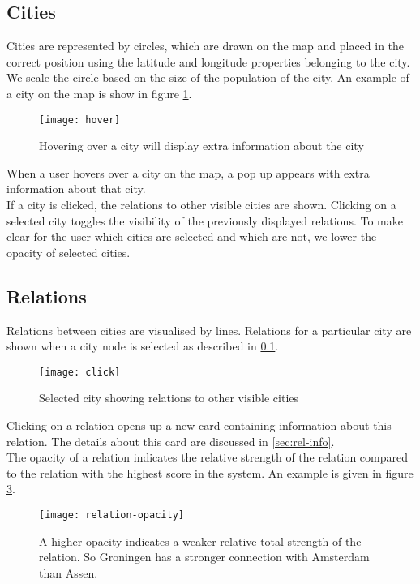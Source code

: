 \subsection{Cities}\label{sec:city}
Cities are represented by circles, which are drawn on the map and placed in the correct position using the latitude and longitude properties belonging to the city. We scale the circle based on the size of the population of the city. An example of a city on the map is show in figure \ref{fig:map-city}.

\begin{figure}[H]
  \centering
  \texttt{[image: hover]}
  \caption{Hovering over a city will display extra information about the city}
  \label{fig:map-city}
\end{figure}

When a user hovers over a city on the map, a pop up appears with extra information about that city.\\
If a city is clicked, the relations to other visible cities are shown. Clicking on a selected city toggles the visibility of the previously displayed relations. To make clear for the user which cities are selected and which are not, we lower the opacity of selected cities.

\subsection{Relations}

Relations between cities are visualised by lines. Relations for a particular city are shown when a city node is selected as described in \ref{sec:city}.\\
\begin{figure}[H]
  \centering
  \texttt{[image: click]}
  \caption{Selected city showing relations to other visible cities}
  \label{fig:sub2}
\end{figure}

Clicking on a relation opens up a new card containing information about this relation. The details about this card are discussed in \ref{sec:rel-info}.\\
The opacity of a relation indicates the relative strength of the relation compared to the relation with the highest score in the system. An example is given in figure \ref{fig:relation-opacity}.

\begin{figure}[H]
  \centering
  \texttt{[image: relation-opacity]}
  \caption{A higher opacity indicates a weaker relative total strength of the relation. So Groningen has a stronger connection with Amsterdam than Assen.}
  \label{fig:relation-opacity}
\end{figure}


